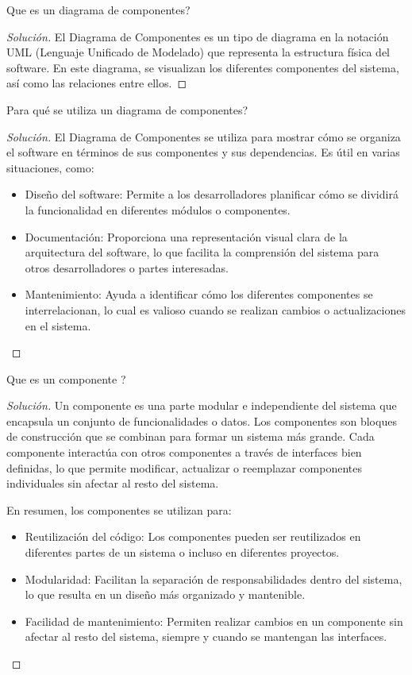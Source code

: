 \documentclass[12pt]{article}
\newenvironment{question}[2][Pregunta]{\begin{trivlist}
\item[\hskip \labelsep {\bfseries #1}\hskip \labelsep {\bfseries #2.}]}{\end{trivlist}}
\newenvironment{solution}{\begin{proof}[Solución]}{\end{proof}} %
\begin{document}
\begin{question}{1}
¿Que es un diagrama de componentes?
\end{question}
\begin{solution}
El Diagrama de Componentes es un tipo de diagrama en la notación UML (Lenguaje Unificado de Modelado) que representa la estructura física del software. En este diagrama, se visualizan los diferentes componentes del sistema, así como las relaciones entre ellos.
\end{solution}
\begin{question}{2}
¿ Para qué se utiliza un diagrama de componentes?
\end{question}
\begin{solution}
El Diagrama de Componentes se utiliza para mostrar cómo se organiza el software en términos de sus componentes y sus dependencias. Es útil en varias situaciones, como:
\begin{itemize}
    \item Diseño del software: Permite a los desarrolladores planificar cómo se dividirá la funcionalidad en diferentes módulos o componentes.
    \item Documentación: Proporciona una representación visual clara de la arquitectura del software, lo que facilita la comprensión del sistema para otros desarrolladores o partes interesadas.
    \item Mantenimiento: Ayuda a identificar cómo los diferentes componentes se interrelacionan, lo cual es valioso cuando se realizan cambios o actualizaciones en el sistema.
\end{itemize}
\end{solution}
\begin{question}{3}
¿ Que es un componente ?
\end{question}
\begin{solution}
Un componente es una parte modular e independiente del sistema que encapsula un conjunto de funcionalidades o datos. Los componentes son bloques de construcción que se combinan para formar un sistema más grande. Cada componente interactúa con otros componentes a través de interfaces bien definidas, lo que permite modificar, actualizar o reemplazar componentes individuales sin afectar al resto del sistema.

En resumen, los componentes se utilizan para:
\begin{itemize}
    \item Reutilización del código: Los componentes pueden ser reutilizados en diferentes partes de un sistema o incluso en diferentes proyectos.
    \item Modularidad: Facilitan la separación de responsabilidades dentro del sistema, lo que resulta en un diseño más organizado y mantenible.
    \item Facilidad de mantenimiento: Permiten realizar cambios en un componente sin afectar al resto del sistema, siempre y cuando se mantengan las interfaces.
\end{itemize}
\end{solution}
\end{document}
